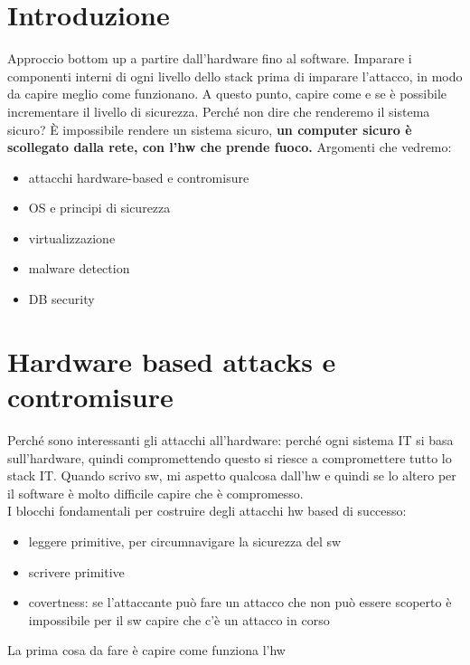 \documentclass[12pt, oneside]{extbook} %
\begin{document}
\chapter{Introduzione}
Approccio bottom up a partire dall'hardware fino al software. Imparare i componenti interni di ogni livello dello stack prima di imparare l'attacco, in modo da capire meglio come funzionano. A questo punto, capire come e se è possibile incrementare il livello di sicurezza. Perché non dire che renderemo il sistema sicuro? È impossibile rendere un sistema sicuro, \textbf{un computer sicuro è scollegato dalla rete, con l'hw che prende fuoco.}
Argomenti che vedremo:
\begin{itemize}
\item attacchi hardware-based e contromisure
\item OS e principi di sicurezza
\item virtualizzazione
\item malware detection
\item DB security
\end{itemize}
\chapter{Hardware based attacks e contromisure}
Perché sono interessanti gli attacchi all'hardware: perché ogni sistema IT si basa sull'hardware, quindi compromettendo questo si riesce a compromettere tutto lo stack IT. Quando scrivo sw, mi aspetto qualcosa dall'hw e quindi se lo altero per il software è molto difficile capire che è compromesso.\\ I blocchi fondamentali per costruire degli attacchi hw based di successo:
\begin{itemize}
\item leggere primitive, per circumnavigare la sicurezza del sw
\item scrivere primitive
\item covertness: se l'attaccante può fare un attacco che non può essere scoperto è impossibile per il sw capire che c'è un attacco in corso
\end{itemize}
La prima cosa da fare è capire come funziona l'hw
\end{document}
